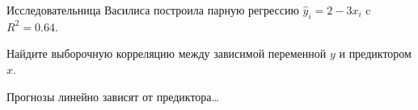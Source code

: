 
\begin{question}
Исследовательница Василиса построила парную регрессию \(\hat y_i = 2 - 3 x_i\) c \(R^2=0.64\).

Найдите выборочную корреляцию между зависимой переменной \(y\) и предиктором \(x\).
\end{question}

\begin{solution}
Прогнозы линейно зависят от предиктора\ldots{}
\end{solution}

